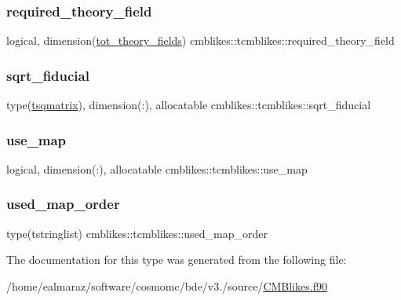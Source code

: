 \subsubsection{\texorpdfstring{required\+\_\+theory\+\_\+field}{required\_theory\_field}}
{\footnotesize\ttfamily logical, dimension(\mbox{\hyperlink{namespacecmblikes_a9a7a0c55bde53b41f76027a48c8eb811}{tot\+\_\+theory\+\_\+fields}}) cmblikes\+::tcmblikes\+::required\+\_\+theory\+\_\+field\hspace{0.3cm}{\ttfamily [private]}}

\mbox{\label{structcmblikes_1_1tcmblikes_a095d79538c8148e7f4eca4a0b72821a2}} 
\subsubsection{\texorpdfstring{sqrt\+\_\+fiducial}{sqrt\_fiducial}}
{\footnotesize\ttfamily type(\mbox{\hyperlink{structcmblikes_1_1tsqmatrix}{tsqmatrix}}), dimension(\+:), allocatable cmblikes\+::tcmblikes\+::sqrt\+\_\+fiducial\hspace{0.3cm}{\ttfamily [private]}}

\mbox{\label{structcmblikes_1_1tcmblikes_a235005ab2cee78be13780289d5981cdd}} 
\subsubsection{\texorpdfstring{use\+\_\+map}{use\_map}}
{\footnotesize\ttfamily logical, dimension(\+:), allocatable cmblikes\+::tcmblikes\+::use\+\_\+map\hspace{0.3cm}{\ttfamily [private]}}

\mbox{\label{structcmblikes_1_1tcmblikes_a4b1dd5a3f9f4da37df7ce0ff23d61744}} 
\subsubsection{\texorpdfstring{used\+\_\+map\+\_\+order}{used\_map\_order}}
{\footnotesize\ttfamily type(tstringlist) cmblikes\+::tcmblikes\+::used\+\_\+map\+\_\+order\hspace{0.3cm}{\ttfamily [private]}}



The documentation for this type was generated from the following file\+:\begin{DoxyCompactItemize}
\item 
/home/ealmaraz/software/cosmomc/bde/v3./source/\mbox{\hyperlink{CMBlikes_8f90}{C\+M\+Blikes.\+f90}}\end{DoxyCompactItemize}

